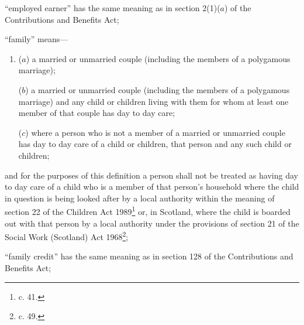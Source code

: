 \documentclass[12pt,a4paper]{article}
\begin{document}
\begin{enumerate}
“employed earner” has the same meaning as in section 2(1)($a$) of the Contributions and Benefits Act;

%

“family” means—
\begin{enumerate}\item[]
($a$) a married or unmarried couple (including the members of a polygamous marriage);

($b$) a married or unmarried couple (including the members of a polygamous marriage) and any child or children living with them for whom at least one member of that couple has day to day care;

($c$) where a person who is not a member of a married or unmarried couple has day to day care of a child or children, that person and any such child or children;
\end{enumerate}
and for the purposes of this definition a person shall not be treated as having day to day care of a child who is a member of that person’s household where the child in question is being looked after by a local authority within the meaning of section 22 of the Children Act 1989\footnote{ c. 41.} or, in Scotland, where the child is boarded out with that person by a local authority under the provisions of section 21 of the Social Work (Scotland) Act 1968\footnote{ c. 49.};

“family credit” has the same meaning as in section 128 of the Contributions and Benefits Act;


\end{enumerate}
\end{document}
